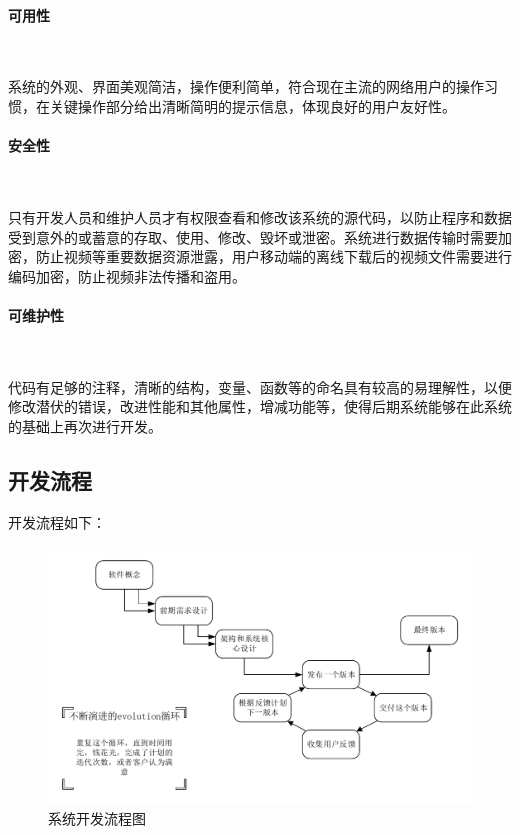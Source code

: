 \paragraph{可用性}\

系统的外观、界面美观简洁，操作便利简单，符合现在主流的网络用户的操作习惯，在关键操作部分给出清晰简明的提示信息，体现良好的用户友好性。

\paragraph{安全性}\

只有开发人员和维护人员才有权限查看和修改该系统的源代码，以防止程序和数据受到意外的或蓄意的存取、使用、修改、毁坏或泄密。系统进行数据传输时需要加密，防止视频等重要数据资源泄露，用户移动端的离线下载后的视频文件需要进行编码加密，防止视频非法传播和盗用。

\paragraph{可维护性}\

代码有足够的注释，清晰的结构，变量、函数等的命名具有较高的易理解性，以便修改潜伏的错误，改进性能和其他属性，增减功能等，使得后期系统能够在此系统的基础上再次进行开发。

\subsection{开发流程}
开发流程如下：
\begin{figure}[H]
	\centering
	\includegraphics[width=0.9\columnwidth]{figures/system_development_process}
	\caption{系统开发流程图}
	\label{fg:system_development_process}
\end{figure}

